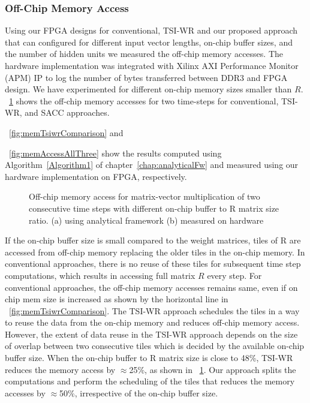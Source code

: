 \subsubsection{Off-Chip Memory Access}
Using our FPGA designs for conventional, TSI-WR and our proposed approach that can configured for different input vector lengths, on-chip buffer sizes, and the number of hidden units we measured the off-chip memory accesses. The hardware implementation was integrated with Xilinx AXI Performance Monitor (APM) IP to log the number of bytes transferred between DDR3 and FPGA design.
We have experimented for different on-chip memory sizes smaller than $R$. \figurename{~\ref{fig:memAccessImprovement}} shows the off-chip memory accesses for two time-steps for conventional, TSI-WR, and SACC approaches.  \figurename{~\ref{fig:memTsiwrComparison} and \figurename{~\ref{fig:memAccessAllThree} show the results computed using Algorithm~\ref{Algorithm1} of chapter~\ref{chap:analyticalFw} and measured using our hardware implementation on FPGA, respectively. 

\begin{figure}[htb!]
	\centering
	\hspace{2.0em}
	\caption{Off-chip memory access for matrix-vector multiplication of two consecutive time steps with different on-chip buffer to R matrix size ratio.  (a)  using analytical framework (b) measured on hardware}	
	\label{fig:memAccessImprovement}
	\vspace{-1.0em}	
\end{figure}
If the on-chip buffer size is small compared to the weight matrices, tiles of R are accessed from off-chip memory replacing the older tiles in the on-chip memory. In conventional approaches, there is no reuse of these tiles for subsequent time step computations, which results in accessing full matrix $R$ every step. For conventional approaches, the off-chip memory accesses remains same, even if on chip mem size is increased as shown by the horizontal line in \figurename{~\ref{fig:memTsiwrComparison}.
The TSI-WR approach schedules the tiles in a way to reuse the data from the on-chip memory and reduces off-chip memory access. However, the extent of data reuse in the TSI-WR approach depends on the size of overlap between two consecutive tiles which is decided by the available on-chip buffer size. When the on-chip buffer to R matrix size is close to 48\%, TSI-WR reduces the memory access by $\approx$25\%, as shown in \figurename{~\ref{fig:memAccessImprovement}}. Our approach splits the computations and perform the scheduling of the tiles that reduces the memory accesses by $\approx$50\%, irrespective of the on-chip buffer size.
}}}

